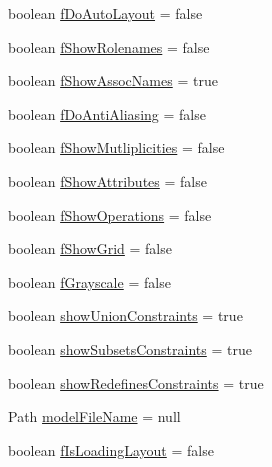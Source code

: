 \begin{DoxyCompactItemize}
\item 
boolean \hyperlink{classorg_1_1tzi_1_1use_1_1gui_1_1views_1_1diagrams_1_1_diagram_options_a9df8d1f0c1054ff08213f37586fd1cc9}{f\-Do\-Auto\-Layout} = false
\item 
boolean \hyperlink{classorg_1_1tzi_1_1use_1_1gui_1_1views_1_1diagrams_1_1_diagram_options_a351a464d7e52c17f679b5ed5fda668e8}{f\-Show\-Rolenames} = false
\item 
boolean \hyperlink{classorg_1_1tzi_1_1use_1_1gui_1_1views_1_1diagrams_1_1_diagram_options_a39117f5d32b8f542e5f44b600ba9190e}{f\-Show\-Assoc\-Names} = true
\item 
boolean \hyperlink{classorg_1_1tzi_1_1use_1_1gui_1_1views_1_1diagrams_1_1_diagram_options_aac505ff3615a82c3cc7dffd788a0f352}{f\-Do\-Anti\-Aliasing} = false
\item 
boolean \hyperlink{classorg_1_1tzi_1_1use_1_1gui_1_1views_1_1diagrams_1_1_diagram_options_a968f8680a445167264da7b72529fa4ad}{f\-Show\-Mutliplicities} = false
\item 
boolean \hyperlink{classorg_1_1tzi_1_1use_1_1gui_1_1views_1_1diagrams_1_1_diagram_options_ae8e9db3805b9d98f098a5c1a8e1a02bd}{f\-Show\-Attributes} = false
\item 
boolean \hyperlink{classorg_1_1tzi_1_1use_1_1gui_1_1views_1_1diagrams_1_1_diagram_options_af2755b3bb7d053939ba180374cfb5b9b}{f\-Show\-Operations} = false
\item 
boolean \hyperlink{classorg_1_1tzi_1_1use_1_1gui_1_1views_1_1diagrams_1_1_diagram_options_ae1375b3820127f5477c2ce2576a9cf8c}{f\-Show\-Grid} = false
\item 
boolean \hyperlink{classorg_1_1tzi_1_1use_1_1gui_1_1views_1_1diagrams_1_1_diagram_options_a9db49416bd865689d7b3ce99365e8b27}{f\-Grayscale} = false
\item 
boolean \hyperlink{classorg_1_1tzi_1_1use_1_1gui_1_1views_1_1diagrams_1_1_diagram_options_aba1d9047a2ee8a0d2c472a38b2a72803}{show\-Union\-Constraints} = true
\item 
boolean \hyperlink{classorg_1_1tzi_1_1use_1_1gui_1_1views_1_1diagrams_1_1_diagram_options_ad25c9ece905676b3b0dfbcb77c5c02c4}{show\-Subsets\-Constraints} = true
\item 
boolean \hyperlink{classorg_1_1tzi_1_1use_1_1gui_1_1views_1_1diagrams_1_1_diagram_options_a18ef674083f02c0e2eb7dd970a260ced}{show\-Redefines\-Constraints} = true
\item 
Path \hyperlink{classorg_1_1tzi_1_1use_1_1gui_1_1views_1_1diagrams_1_1_diagram_options_a2a82d18574d669501f037d6783495aec}{model\-File\-Name} = null
\item 
boolean \hyperlink{classorg_1_1tzi_1_1use_1_1gui_1_1views_1_1diagrams_1_1_diagram_options_a341d5b989ea29492481c993031619670}{f\-Is\-Loading\-Layout} = false
\end{DoxyCompactItemize}


